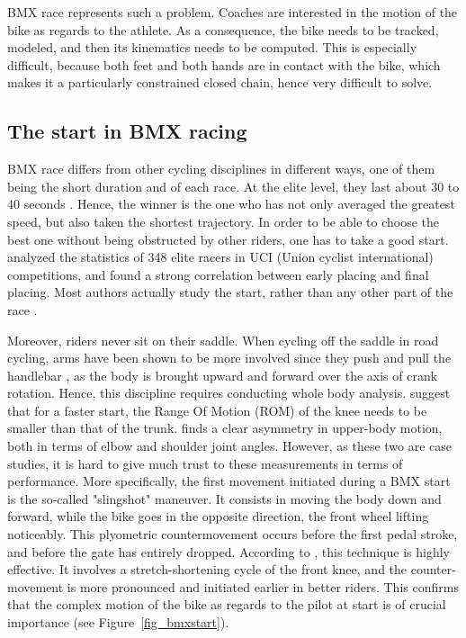 BMX race represents such a problem. Coaches are interested in the motion of the bike as regards to the athlete. As a consequence, the bike needs to be tracked, modeled, and then its kinematics needs to be computed. This is especially difficult, because both feet and both hands are in contact with the bike, which makes it a particularly constrained closed chain, hence very difficult to solve. 


\subsection{The start in BMX racing}
BMX race differs from other cycling disciplines in different ways, one of them being the short duration and of each race. At the elite level, they last about 30 to 40 seconds \cite{Cowell2012}. Hence, the winner is the one who has not only averaged the greatest speed, but also taken the shortest trajectory. In order to be able to choose the best one without being obstructed by other riders, one has to take a good start. \cite{Rylands2014} analyzed the statistics of 348 elite racers in UCI (Union cyclist international) competitions, and found a strong correlation between early placing and final placing. Most authors actually study the start, rather than any other part of the race \cite{Zabala2009,Gianikellis2011,Chiementin2012,Kalichova2013,Rylands2014}.

Moreover, riders never sit on their saddle. When cycling off the saddle in road cycling, arms have been shown to be more involved since they push and pull the handlebar \cite{Stone1993}, as the body is brought upward and forward over the axis of crank rotation. Hence, this discipline requires conducting whole body analysis. \cite{Gianikellis2011} suggest that for a faster start, the Range Of Motion (ROM) of the knee needs to be smaller than that of the trunk. \cite{Kalichova2013} finds a clear asymmetry in upper-body motion, both in terms of elbow and shoulder joint angles. However, as these two are case studies, it is hard to give much trust to these measurements in terms of performance. More specifically, the first movement initiated during a BMX start is the so-called "slingshot" maneuver. It consists in moving the body down and forward, while the bike goes in the opposite direction, the front wheel lifting noticeably. This plyometric countermovement occurs before the first pedal stroke, and before the gate has entirely dropped. According to \cite{Gross2017}, this technique is highly effective. It involves a stretch-shortening cycle of the front knee, and the counter-movement is more pronounced and initiated earlier in better riders. This confirms that the complex motion of the bike as regards to the pilot at start is of crucial importance (see Figure~\ref{fig_bmxstart}). 

